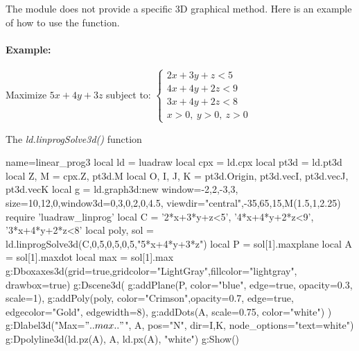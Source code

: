 The module does not provide a specific 3D graphical method. Here is an example of how to use the  function.

\paragraph{Example:} Maximize $5x+4y+3z$ subject to: $\begin{cases}2x+3y+z<5\\4x+4y+2z<9\\3x+4y+2z<8\\x>0,\ y>0,\ z>0\end{cases}$

\begin{demo}{The \emph{ld.linprogSolve3d()} function}
\begin{luadraw}{name=linear_prog3}
local ld = luadraw
local cpx = ld.cpx
local pt3d = ld.pt3d
local Z, M = cpx.Z, pt3d.M
local O, I, J, K = pt3d.Origin, pt3d.vecI, pt3d.vecJ, pt3d.vecK
local g = ld.graph3d:new{ window={-2,2,-3,3}, size={10,12,0},window3d={0,3,0,2,0,4.5}, 
    viewdir={"central",-35,65,15,M(1.5,1,2.25)}}
require 'luadraw_linprog'
local C = {'2*x+3*y+z<5', '4*x+4*y+2*z<9', '3*x+4*y+2*z<8'}
local poly, sol = ld.linprogSolve3d(C,0,5,0,5,0,5,{"5*x+4*y+3*z"})
local P = sol[1].maxplane
local A = sol[1].maxdot
local max = sol[1].max
g:Dboxaxes3d({grid=true,gridcolor="LightGray",fillcolor="lightgray", drawbox=true})
g:Dscene3d(
    g:addPlane(P, {color="blue", edge=true, opacity=0.3, scale=1}),
    g:addPoly(poly, {color="Crimson",opacity=0.7, edge=true, edgecolor="Gold", edgewidth=8}),
    g:addDots(A, {scale=0.75, color="white"})
    )
g:Dlabel3d("Max=$"..max.."$", A, {pos="N", dir={I,K}, node_options="text=white"})
g:Dpolyline3d({ld.pz(A), A, ld.px(A)}, "white")
g:Show()
\end{luadraw}
\end{demo}
